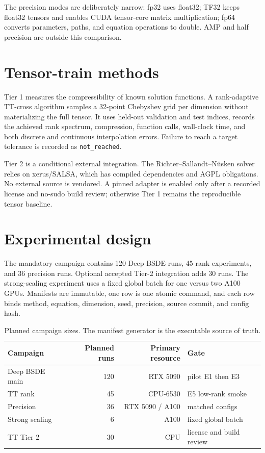 \documentclass[11pt]{article}
\begin{document}
The precision modes are deliberately narrow: fp32 uses float32; TF32 keeps float32 tensors
and enables CUDA tensor-core matrix multiplication; fp64 converts parameters, paths, and
equation operations to double. AMP and half precision are outside this comparison.

\section{Tensor-train methods}
Tier 1 measures the compressibility of known solution functions. A rank-adaptive TT-cross
algorithm samples a 32-point Chebyshev grid per dimension without materializing the full
tensor. It uses held-out validation and test indices, records the achieved rank spectrum,
compression, function calls, wall-clock time, and both discrete and continuous interpolation
errors. Failure to reach a target tolerance is recorded as \texttt{not\_reached}.

Tier 2 is a conditional external integration. The Richter--Sallandt--N\"usken solver relies
on xerus/SALSA, which has compiled dependencies and AGPL obligations. No external source is
vendored. A pinned adapter is enabled only after a recorded license and no-sudo build review;
otherwise Tier 1 remains the reproducible tensor baseline.

\section{Experimental design}
The mandatory campaign contains 120 Deep BSDE runs, 45 rank experiments, and 36 precision
runs. Optional accepted Tier-2 integration adds 30 runs. The strong-scaling experiment uses
a fixed global batch for one versus two A100 GPUs. Manifests are immutable, one row is one
atomic command, and each row binds method, equation, dimension, seed, precision, source
commit, and config hash.

\begin{table}[ht]
\centering
\begin{tabular}{lrrl}
\toprule
Campaign & Planned runs & Primary resource & Gate \\
\midrule
Deep BSDE main & 120 & RTX 5090 & pilot E1 then E3 \\
TT rank & 45 & CPU-6530 & E5 low-rank smoke \\
Precision & 36 & RTX 5090 / A100 & matched configs \\
Strong scaling & 6 & A100 & fixed global batch \\
TT Tier 2 & 30 & CPU & license and build review \\
\bottomrule
\end{tabular}
\caption{Planned campaign sizes. The manifest generator is the executable source of truth.}
\end{table}
\end{document}
